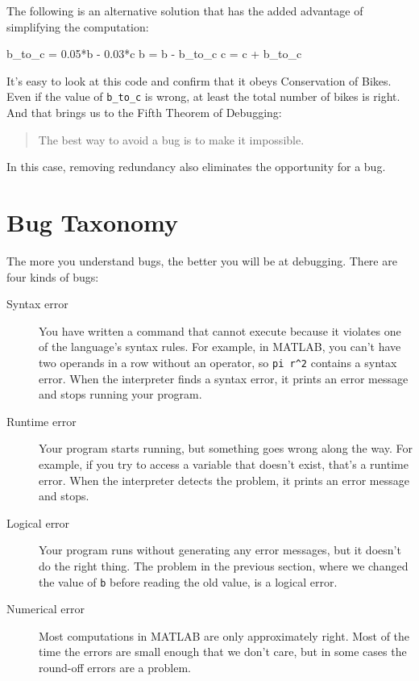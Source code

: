 
The following is an alternative solution that
has the added advantage of simplifying the computation:

\begin{code}
b_to_c = 0.05*b - 0.03*c
b = b - b_to_c
c = c + b_to_c
\end{code}

It's easy to look at this code and confirm that it obeys Conservation
of Bikes.  Even if the value of \lstinline{b_to_c} is wrong, at least the total
number of bikes is right.  And that brings us to the Fifth Theorem of
Debugging:

\begin{quote}
The best way to avoid a bug is to make it impossible.
\end{quote}

In this case, removing redundancy also eliminates the opportunity for \linebreak a bug.

\section{Bug Taxonomy}

The more you understand bugs, the better you will be at debugging.
There are four kinds of bugs:


\begin{description}

\item[Syntax error] You have written a command that cannot
execute because it violates one of the language's syntax rules.  For example, in MATLAB,
you can't have two operands in a row without an operator, so
\lstinline{pi r^2} contains a syntax error.  When the interpreter finds a syntax
error, it prints an error message and stops running your program.

\item[Runtime error] Your program starts running, but something goes
wrong along the way.  For example, if you try to access a variable
that doesn't exist, that's a runtime error.  When the interpreter detects the
problem, it prints an error message and stops.

\item[Logical error] Your program runs without generating any error
messages, but it doesn't do the right thing.  The problem in the
previous section, where we changed the value of \lstinline{b} before
reading the old value, is a logical error.

\item[Numerical error] Most computations in MATLAB are only
approximately right.  Most of the time the errors are small enough
that we don't care, but in some cases the round-off errors are a problem.

\end{description}

